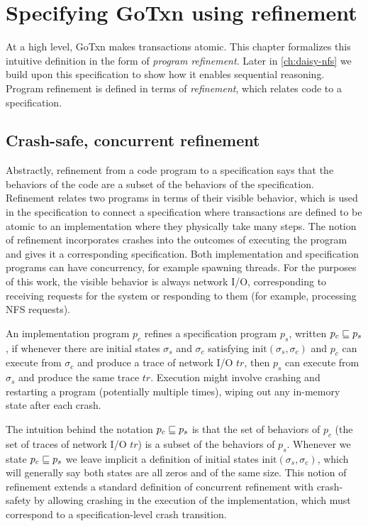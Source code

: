\section{Specifying GoTxn using refinement}%
\label{sec:txn:spec}

At a high level, GoTxn makes transactions atomic. This chapter formalizes this
intuitive definition in the form of \emph{program refinement}. Later in
\cref{ch:daisy-nfs} we build upon this specification to show how it enables
sequential reasoning. Program refinement is defined in terms of
\emph{refinement}, which relates code to a specification.

\subsection{Crash-safe, concurrent refinement}%
\label{sec:txn:refinement-def}

Abstractly, refinement from a code program to a specification says that the
behaviors of the code are a subset of the behaviors of the specification.
Refinement relates two programs in terms of their visible behavior, which is
used in the specification to connect a specification where transactions are
defined to be atomic to an implementation where they physically take many steps.
The notion of refinement incorporates crashes into the outcomes of executing the
program and gives it a corresponding specification. Both implementation and
specification programs can have concurrency, for example spawning threads. For
the purposes of this work, the visible behavior is always network I/O,
corresponding to receiving requests for the system or responding to them (for
example, processing NFS requests).

\begin{definition}[Refinement]
  An implementation program $p_{c}$ refines a specification program $p_{s}$,
written $p_{c} \sqsubseteq p_{s}$, if whenever there are initial states
$\sigma_{s}$ and $\sigma_{c}$ satisfying $\mathrm{init}(\sigma_{s}, \sigma_{c})$
and $p_{c}$ can execute from $\sigma_{c}$ and produce a trace of network I/O
$\textit{tr}$, then $p_{s}$ can execute from $\sigma_{s}$ and produce the same trace
$\textit{tr}$.  Execution might involve crashing and restarting a program (potentially
multiple times), wiping out any in-memory state after each crash.
  \label{def:refinement}
\end{definition}

The intuition behind the notation $p_{c} \sqsubseteq p_{s}$ is that the set of
behaviors of $p_{c}$ (the set of traces of network I/O $\textit{tr}$) is a subset of the
behaviors of $p_{s}$. Whenever we state $p_{c} \sqsubseteq p_{s}$ we leave implicit
a definition of initial states $\mathrm{init}(\sigma_{s}, \sigma_{c})$, which
will generally say both states are all zeros and of the same size. This notion
of refinement extends a standard definition of concurrent refinement with
crash-safety by allowing crashing in the execution of the implementation, which
must correspond to a specification-level crash transition.

